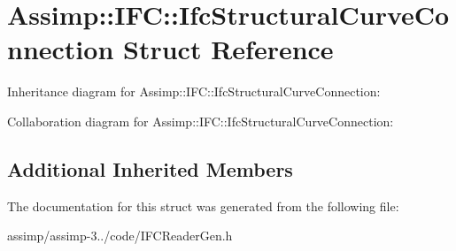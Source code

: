 \hypertarget{struct_assimp_1_1_i_f_c_1_1_ifc_structural_curve_connection}{\section{Assimp\+:\+:I\+F\+C\+:\+:Ifc\+Structural\+Curve\+Connection Struct Reference}
\label{struct_assimp_1_1_i_f_c_1_1_ifc_structural_curve_connection}
}


Inheritance diagram for Assimp\+:\+:I\+F\+C\+:\+:Ifc\+Structural\+Curve\+Connection\+:


Collaboration diagram for Assimp\+:\+:I\+F\+C\+:\+:Ifc\+Structural\+Curve\+Connection\+:
\subsection*{Additional Inherited Members}


The documentation for this struct was generated from the following file\+:\begin{DoxyCompactItemize}
\item 
assimp/assimp-\/3../code/I\+F\+C\+Reader\+Gen.\+h\end{DoxyCompactItemize}

